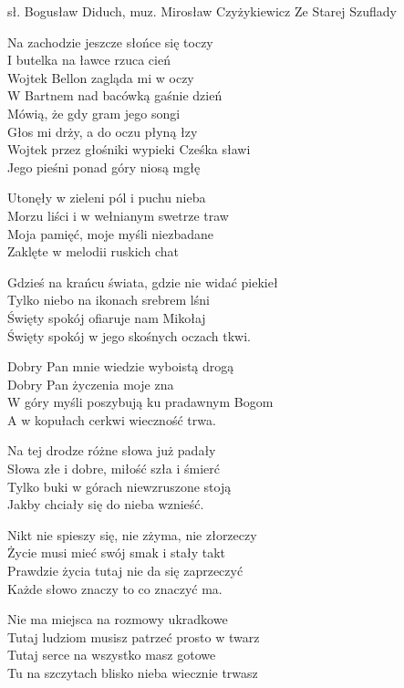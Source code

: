 {sł. Bogusław Diduch, muz. Mirosław Czyżykiewicz}
{Ze Starej Szuflady}
\begin{text}
\hfill\break
\vin Na zachodzie jeszcze słońce się toczy\\
\vin I butelka na ławce rzuca cień\\
\vin Wojtek Bellon zagląda mi w oczy\\
\vin W Bartnem nad bacówką gaśnie dzień\\
\vin Mówią, że gdy gram jego songi\\
\vin Głos mi drży, a do oczu płyną łzy\\
\vin Wojtek przez głośniki wypieki Cześka sławi\\
\vin Jego pieśni ponad góry niosą mgłę

Utonęły w zieleni pól i puchu nieba\\
Morzu liści i w wełnianym swetrze traw\\
Moja pamięć, moje myśli niezbadane\\
Zaklęte w melodii ruskich chat

Gdzieś na krańcu świata, gdzie nie widać piekieł\\
Tylko niebo na ikonach srebrem lśni\\
Święty spokój ofiaruje nam Mikołaj\\
Święty spokój w jego skośnych oczach tkwi.

\vin Dobry Pan mnie wiedzie wyboistą drogą\\
\vin Dobry Pan życzenia moje zna\\
\vin W góry myśli poszybują ku pradawnym Bogom\\
\vin A w kopułach cerkwi wieczność trwa.

\vin Na tej drodze różne słowa już padały\\
\vin Słowa złe i dobre, miłość szła i śmierć\\
\vin Tylko buki w górach niewzruszone stoją\\
\vin Jakby chciały się do nieba wznieść.

Nikt nie spieszy się, nie zżyma, nie złorzeczy\\
Życie musi mieć swój smak i stały takt\\
Prawdzie życia tutaj nie da się zaprzeczyć\\
Każde słowo znaczy to co znaczyć ma.

Nie ma miejsca na rozmowy ukradkowe\\
Tutaj ludziom musisz patrzeć prosto w twarz\\
Tutaj serce na wszystko masz gotowe\\
Tu na szczytach blisko nieba wiecznie trwasz
\end{text}

